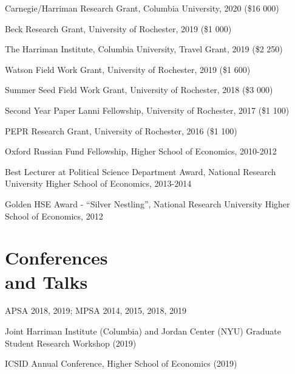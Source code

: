 \documentclass[margin,line,12pt]{res}
\begin{document}
\begin{resume}
Carnegie/Harriman Research Grant, Columbia University, 2020 (\$16 000)
\vspace*{-4.5mm}

Beck Research Grant, University of Rochester, 2019 (\$1 000)
\vspace*{-4.5mm}

The Harriman Institute, Columbia University, Travel Grant, 2019 (\$2 250)
\vspace*{-4.5mm}

Watson Field Work Grant, University of Rochester, 2019 (\$1 600)
\vspace*{-4.5mm}

Summer Seed Field Work Grant, University of Rochester, 2018 (\$3 000)
\vspace*{-4.5mm}

Second Year Paper Lanni Fellowship, University of Rochester, 2017 (\$1 100)
\vspace*{-4.5mm}

PEPR Research Grant, University of Rochester, 2016 (\$1 100)
\vspace*{-4.5mm}


Oxford Russian Fund Fellowship, Higher School of Economics, 2010-2012 
\vspace*{-2.5mm}

Best Lecturer at Political Science Department Award, National Research University Higher School of Economics, 2013-2014 
\vspace*{-4.5mm}

Golden HSE Award - ``Silver Nestling'', National Research University Higher School of Economics, 2012
\vspace*{-2.5mm}


\section{\sc Conferences \\ and Talks}

APSA 2018, 2019; MPSA 2014, 2015, 2018, 2019
  \vspace*{-4.5mm} 

Joint Harriman Institute (Columbia) and Jordan Center (NYU) Graduate Student Research Workshop (2019)

\vspace*{-4.5mm}
 ICSID Annual Conference, Higher School of Economics (2019)


\end{resume}
\end{document}
